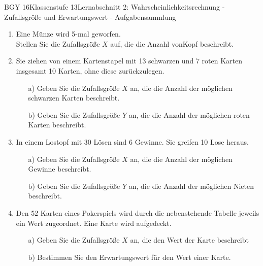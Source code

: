\documentclass[oneside,openany,headings=optiontotoc,11pt,numbers=noenddot]{scrreprt}
\begin{document}
	\begin{worksheet}{BGY 16}{Klassenstufe 13}{Lernabschnitt 2: Wahrscheinlichkeitsrechnung - Zufallsgröße und Erwartungswert - Aufgabensammlung}
		\noindent
		\sffamily
		\begin{framed}
			\begin{enumerate}
				\item Eine Münze wird 5-mal geworfen.\\
				Stellen Sie die Zufallsgröße \(X\) auf, die die Anzahl von\glqq{}Kopf\grqq{} beschreibt.\\
				
				\item Sie ziehen von einem Kartenstapel mit 13 schwarzen und 7 roten Karten insgesamt 10 Karten, ohne diese zurückzulegen.
				\begin{itemize}
					\item[a)] Geben Sie die Zufallsgröße \(X\) an, die die Anzahl der möglichen schwarzen Karten beschreibt.
					\item[b)] Geben Sie die Zufallsgröße \(Y\) an, die die Anzahl der möglichen roten Karten beschreibt.
				\end{itemize}
				\item In einem Lostopf mit 30 Lösen sind 6 Gewinne. Sie greifen 10 Lose heraus.
				\begin{itemize}
					\item [a)] Geben Sie die Zufallsgröße \(X\) an, die die Anzahl der möglichen Gewinne beschreibt.
					\item[b)] Geben Sie die Zufallsgröße \(Y\) an, die die Anzahl der möglichen Nieten beschreibt.
				\end{itemize}
				\item Den 52 Karten eines Pokerspiels wird durch die nebenstehende Tabelle jeweils ein Wert zugeordnet. Eine Karte wird aufgedeckt.\\
				\begin{minipage}{0.7\textwidth}
					\begin{itemize}
						\item[a)] Geben Sie die Zufallsgröße \(X\) an, die den Wert der Karte beschreibt
						\item[b)] Bestimmen Sie den Erwartungswert für den Wert einer Karte.
					\end{itemize}
				\end{minipage}
				\hfill
				\begin{minipage}{0.18\textwidth}
					\begin{tabular}{c|c}

\end{tabular}
\end{minipage}
\end{enumerate}
\end{framed}
\end{worksheet}
\end{document}
